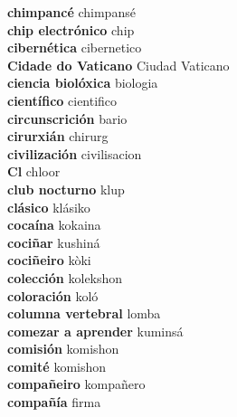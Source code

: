 \textbf{ chimpancé  } chimpansé \\
\textbf{ chip electrónico  } chip \\
\textbf{ cibernética  } cibernetico \\
\textbf{ Cidade do Vaticano  } Ciudad Vaticano \\
\textbf{ ciencia biolóxica  } biologia \\
\textbf{ científico  } cientifico \\
\textbf{ circunscrición  } bario \\
\textbf{ cirurxián  } chirurg \\
\textbf{ civilización  } civilisacion \\
\textbf{ Cl  } chloor \\
\textbf{ club nocturno  } klup \\
\textbf{ clásico  } klásiko \\
\textbf{ cocaína  } kokaina \\
\textbf{ cociñar  } kushiná \\
\textbf{ cociñeiro  } kòki \\
\textbf{ colección  } kolekshon \\
\textbf{ coloración  } koló \\
\textbf{ columna vertebral  } lomba \\
\textbf{ comezar a aprender  } kuminsá \\
\textbf{ comisión  } komishon \\
\textbf{ comité  } komishon \\
\textbf{ compañeiro  } kompañero \\
\textbf{ compañía  } firma \\
